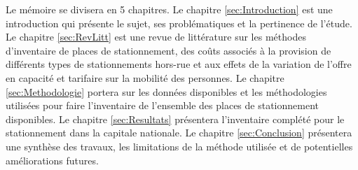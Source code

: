 Le mémoire se divisera en 5 chapitres. Le chapitre \ref{sec:Introduction} est une introduction qui présente le sujet, ses problématiques et la pertinence de l'étude. Le chapitre \ref{sec:RevLitt} est une revue de littérature sur les méthodes d'inventaire de places de stationnement, des coûts associés à la provision de différents types de stationnements hors-rue et aux effets de la variation de l'offre en capacité et tarifaire sur la mobilité des personnes. Le chapitre \ref{sec:Methodologie} portera sur les données disponibles et les méthodologies utilisées pour faire l'inventaire de l'ensemble des places de stationnement disponibles. Le chapitre \ref{sec:Resultats} présentera l'inventaire complété pour le stationnement dans la capitale nationale. Le chapitre \ref{sec:Conclusion} présentera une synthèse des travaux, les limitations de la méthode utilisée et de potentielles améliorations futures.

\clearpage
